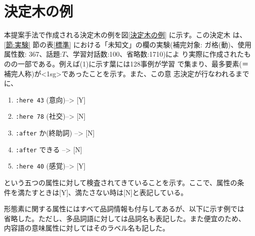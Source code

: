 \begin{biography}



\end{biography}





\appendix
\section{決定木の例}
\label{節:決定木}

本提案手法で作成される決定木の例を図\ref{決定木の例} に示す。この決定木
は、\ref{節:実験} 節の表\ref{標準} における「未知文」の欄の実験(補完対象:
ガ格(動)、使用属性数: 367、話題:$T$、学習対話数:100、省略数:1710)によ
り実際に作成されたものの一部である。例えば(1)に示す葉には128事例が学習
で集まり、最多要素(＝補完人称)が<1sg>であったことを示す。また、この意
志決定が行なわれるまでに、

\begin{enumerate}
\item \verb+:here 43+ (意向)--> [Y]
\item \verb+:here 78+ (社交)--> [N]
\item \verb+:after+ か(終助詞) --> [N]
\item \verb+:after+ できる --> [N]
\item \verb+:here 40+ (感覚)--> [Y]
\end{enumerate}

\noindent
という五つの属性に対して検査されてきていることを示す。ここで、属性の条
件を満たすときは[Y]、満たさない時は[N]と表記している。

形態素に関する属性にはすべて品詞情報も付与してあるが、以下に示す例では
省略した。ただし、多品詞語に対しては品詞名も表記した。また便宜のため、
内容語の意味属性に対してはそのラベル名も記した。


